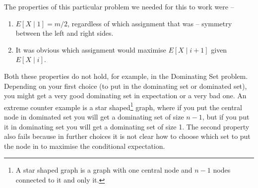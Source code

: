 \noindent The properties of this particular problem we needed for this to work were -- 

\noindent \begin{enumerate}
\item $E[X \mid 1] = m/2$, regardless of which assignment that was -- symmetry between the left and right sides.
\item It was obvious which assignment would maximise $E[X \mid i+1]$ given $E[X \mid i]$.
\end{enumerate}

\noindent Both these properties do not hold, for example, in the Dominating Set problem. Depending 
on your first choice (to put in the dominating set or dominated set), you might get a 
very good dominating set in expectation or a very bad one. An extreme counter example is a star shaped\footnote{A star shaped graph is a graph with 
one central node and \(n-1\) nodes connected to it and only it.} 
graph, where if you put the central node in dominated set you will get a dominating set of size \(n-1\), 
but if you put it in dominating set you will get a dominating set of size 1. 
The second property also fails because in further choices it is not 
clear how to choose which set to put the node in to maximise the conditional expectation.




\clearpage
